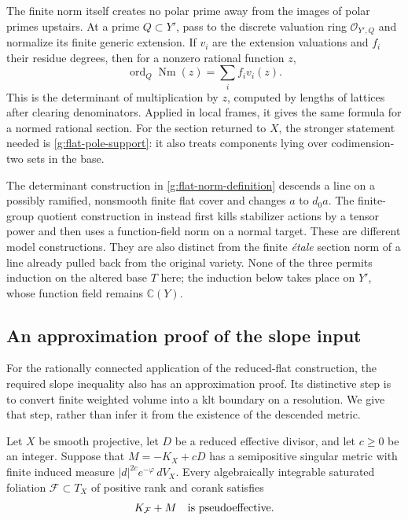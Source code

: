 \begin{remark}
\label{g:flat-norm-valuations}
The finite norm itself creates no polar prime away from the images of
polar primes upstairs.  At a prime \(Q\subset Y'\), pass to the discrete
valuation ring \(\mathcal O_{Y',Q}\) and normalize its finite generic
extension.  If \(v_i\) are the extension valuations and \(f_i\) their
residue degrees, then for a nonzero rational function \(z\),
\[
                \operatorname{ord}_Q\operatorname{Nm}(z)
                             =\sum_i f_i v_i(z).
\]
This is the determinant of multiplication by \(z\), computed by lengths
of lattices after clearing denominators.  Applied in local frames, it
gives the same formula for a normed rational section.  For the section
returned to \(X\), the stronger statement needed is
\eqref{g:flat-pole-support}: it also treats components lying over
codimension-two sets in the base.
\end{remark}

\begin{remark}
The determinant construction in \eqref{g:flat-norm-definition} descends
a line on a possibly ramified, nonsmooth finite flat cover and changes
\(a\) to \(d_0a\).  The finite-group quotient construction in
\cite[Subsection ``Descending the alteration and its section'']{CCohomologicalTransfer}
instead first kills stabilizer actions by
a tensor power and then uses a function-field norm on a normal target.
These are different model constructions.  They are also distinct from
the finite \emph{\'etale} section norm of a line already pulled back from
the original variety.  None of the three permits induction on the
altered base \(T\) here; the induction below takes place on \(Y'\),
whose function field remains \(\mathbb C(Y)\).
\end{remark}

\subsection{An approximation proof of the slope input}

For the rationally connected application of the reduced-flat
construction, the required slope inequality also has an approximation
proof.  Its distinctive step is to convert finite weighted volume into
a klt boundary on a resolution.  We give that step, rather than infer
it from the existence of the descended metric.

\begin{proposition}
\label{g:reduced-flat-slope}
Let \(X\) be smooth projective, let \(D\) be a reduced effective divisor,
and let \(c\ge0\) be an integer. Suppose that \(M=-K_X+cD\) has a
semipositive singular metric with finite induced measure
\(|d|^{2c}e^{-\varphi}\,dV_X\). Every algebraically integrable saturated
foliation \(\mathcal F\subset T_X\) of positive rank and corank satisfies
\begin{equation}
                         K_{\mathcal F}+M
                          \quad\hbox{is pseudoeffective}.
 \label{g:flat-foliation-psef}
\end{equation}
\end{proposition}

